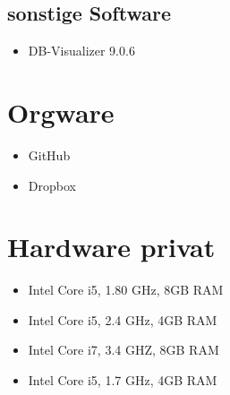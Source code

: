\documentclass[a4paper]{scrreprt}
\begin{document}
        \subsection{sonstige Software}
            \begin{itemize}
            	\item DB-Visualizer 9.0.6
            \end{itemize}
           
    \section{Orgware}
        \begin{itemize}
        	\item GitHub
        	\item Dropbox
        \end{itemize}
        
    \section{Hardware privat}
        \begin{itemize}
        	\item Intel Core i5, 1.80 GHz, 8GB RAM
        	\item Intel Core i5, 2.4 GHz, 4GB RAM
        	\item Intel Core i7, 3.4 GHZ, 8GB RAM
        	\item Intel Core i5, 1.7 GHz, 4GB RAM
        \end{itemize}
            
        
\printnoidxglossaries
\end{document}
